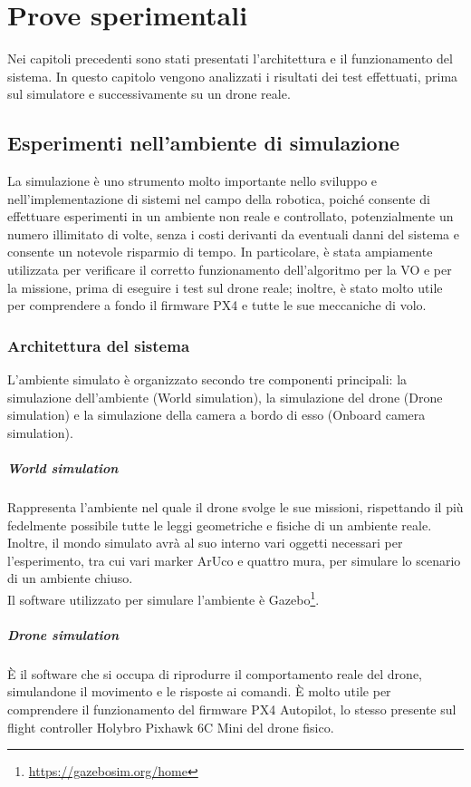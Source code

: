 \chapter{Prove sperimentali}
\label{chap:prove_sperimentali}
Nei capitoli precedenti sono stati presentati l'architettura e il funzionamento del sistema. In questo capitolo vengono analizzati i risultati dei test effettuati, prima sul simulatore e successivamente su un drone reale.

\section{Esperimenti nell'ambiente di simulazione}
La simulazione è uno strumento molto importante nello sviluppo e nell'implementazione di sistemi nel campo della robotica, poiché consente di effettuare esperimenti in un ambiente non reale e controllato, potenzialmente un numero illimitato di volte, senza i costi derivanti da eventuali danni del sistema e consente un notevole risparmio di tempo.
 In particolare, è stata ampiamente utilizzata per verificare il corretto funzionamento dell'algoritmo per la VO e per la missione, prima di eseguire i test sul drone reale; inoltre, è stato molto utile per comprendere a fondo il firmware PX4 e tutte le sue meccaniche di volo. 
 
 \subsection{Architettura del sistema}
 L'ambiente simulato è organizzato secondo tre componenti principali: la simulazione dell'ambiente (World simulation), la simulazione del drone (Drone simulation) e la simulazione della camera a bordo di esso (Onboard camera simulation).
 
 \paragraph{World simulation} Rappresenta l'ambiente nel quale il drone svolge le sue missioni, rispettando il più fedelmente possibile tutte le leggi geometriche e fisiche di un ambiente reale. Inoltre, il mondo simulato avrà al suo interno vari oggetti necessari per l'esperimento, tra cui vari marker ArUco e quattro mura, per simulare lo scenario di un ambiente chiuso. \\
 Il software utilizzato per simulare l'ambiente è Gazebo\footnote{\url{https://gazebosim.org/home}}.
 
 \paragraph{Drone simulation} È il software che si occupa di riprodurre il comportamento reale del drone, simulandone il movimento e le risposte ai comandi. È molto utile per comprendere il funzionamento del firmware PX4 Autopilot, lo stesso presente sul flight controller Holybro Pixhawk 6C Mini del drone fisico.
  
